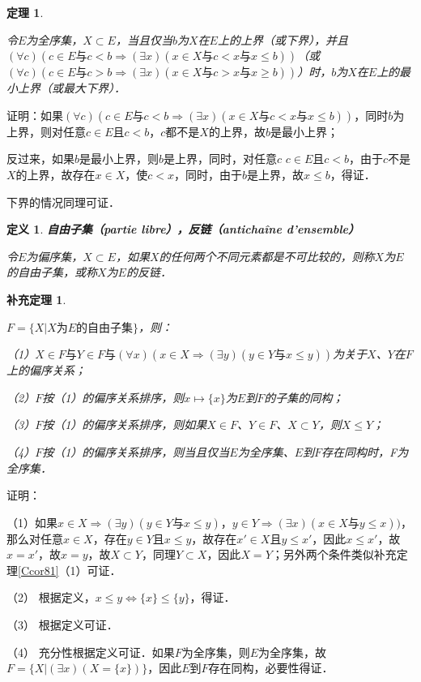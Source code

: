 \documentclass[12pt, a4paper, oneside]{book}
\newtheorem{theo}{定理}
\newtheorem{cor}{补充定理}
\newtheorem{de}{定义}
\begin{document}
			\begin{theo}\label{theo70}
				\hfill\par
				令$E$为全序集，$X\subset E$，当且仅当$b$为$X$在$E$上的上界（或下界），并且$(\forall c)(c\in E\text{与}c<b\Rightarrow (\exists x)(x\in X\text{与}c<x\text{与}x\leq b))$（或$(\forall c)(c\in E\text{与}c>b\Rightarrow (\exists x)(x\in X\text{与}c>x\text{与}x\geq b))$）时，$b$为$X$在$E$上的最小上界（或最大下界）．
			\end{theo}
			证明：如果$(\forall c)(c\in E\text{与}c<b\Rightarrow (\exists x)(x\in X\text{与}c<x\text{与}x\leq b))$，同时$b$为上界，则对任意$c\in E$且$c<b$，$c$都不是$X$的上界，故$b$是最小上界；
			\par
			反过来，如果$b$是最小上界，则$b$是上界，同时，对任意$c$ $c\in E$且$c<b$，由于$c$不是$X$的上界，故存在$x\in X$，使$c<x$，同时，由于$b$是上界，故$x\leq b$，得证．
			\par
			下界的情况同理可证．
			
			\begin{de}
				\textbf{自由子集（partie libre），反链（antichaîne d'ensemble）}
				\par
				令$E$为偏序集，$X\subset E$，如果$X$的任何两个不同元素都是不可比较的，则称$X$为$E$的自由子集，或称$X$为$E$的反链．
			\end{de}

			\begin{cor}\label{cor193}
				\hfill\par
				$F=\{X|X\text{为}E\text{的自由子集}\}$，则：
				\par
				（1）$X\in F\text{与}Y\in F\text{与}(\forall x)(x\in X\Rightarrow (\exists y)(y\in Y\text{与}x\leq y))$为关于$X$、$Y$在$F$上的偏序关系；
				\par
				（2）$F$按（1）的偏序关系排序，则$x\mapsto \{x\}$为$E$到$F$的子集的同构；
				\par
				（3）$F$按（1）的偏序关系排序，则如果$X\in F$、$Y\in F$、$X\subset Y$，则$X\leq Y$；
				\par
				（4）$F$按（1）的偏序关系排序，则当且仅当$E$为全序集、$E$到$F$存在同构时，F为全序集．
			\end{cor}
			证明：
			\par
			（1）如果$x\in X\Rightarrow (\exists y)(y\in Y\text{与}x\leq y)$，$y\in Y\Rightarrow (\exists x)(x\in X\text{与}y\leq x))$，那么对任意$x\in X$，存在$y\in Y$且$x\leq y$，故存在$x' \in X$且$y\leq x'$，因此$x\leq x'$，故$x=x'$，故$x=y$，故$X\subset Y$，同理$Y\subset X$，因此$X=Y$；另外两个条件类似补充定理\ref{Ccor81}（1）可证．
			\par
			（2）	根据定义，$x\leq y\Leftrightarrow \{x\}\leq \{y\}$，得证．
			\par
			（3）	根据定义可证．
			\par
			（4）	充分性根据定义可证．如果$F$为全序集，则$E$为全序集，故$F=\{X|(\exists x)(X=\{x\})\}$，因此$E$到$F$存在同构，必要性得证．
\end{document}
